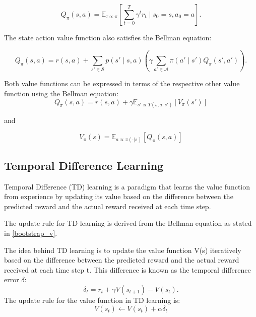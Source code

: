\begin{equation}
    Q_{\pi}(s, a) = \mathbb{E}_{\tau \propto \pi}\left[\sum_{t=0}^T \gamma^t r_t \mid s_0 = s, a_0=a\right].
\end{equation}

The state action value function also satisfies the Bellman equation:

\begin{equation}
    \label{bmeq_q}
    Q_{\pi}(s,a) = r(s,a) + \sum_{s' \in \mathcal{S}} p(s' \mid s,a) \left(\gamma \sum_{a' \in \mathcal{A}} \pi(a' \mid s') Q_{\pi}(s',a')\right).
\end{equation}

Both value functions can be expressed in terms of the respective other value function using the Bellman equation:
\begin{equation}
    \label{q_from_v}
    Q_{\pi}(s,a) = r(s,a) + \gamma \mathbb{E}_{s'\propto T(s,a,s')}\left[ V_{\pi}(s') \right]
\end{equation}

and 

\begin{equation}
    V_{\pi}(s) = \mathbb{E}_{a \propto \pi(\cdot|s)} \left[ Q_\pi(s,a) \right]
\end{equation}



\subsection{Temporal Difference Learning}
\label{subsection:TD_learning}
Temporal Difference (TD) learning is a paradigm that learns the value function from experience by updating its value based on the difference between the predicted reward and the actual reward received at each time step.

The update rule for TD learning is derived from the Bellman equation as stated in \ref{bootstrap_v}.

The idea behind TD learning is to update the value function V(s) iteratively based on the difference between the predicted reward and the actual reward received at each time step t. This difference is known as the temporal difference error $\delta$:
\begin{equation}
    \label{TD_update}
    \delta_t = r_t + \gamma V(s_{t+1}) - V(s_t).
\end{equation}
The update rule for the value function in TD learning is:
$$V(s_t) \leftarrow V(s_t) + \alpha \delta_t$$

